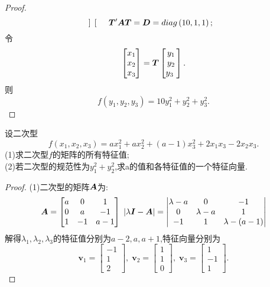 \documentclass[lang=cn,11pt,normal]{elegantbook}
\begin{document}
\begin{proof}
\begin{equation}
\begin{bmatrix}
		\end{bmatrix}
		\qquad\TT'\AA\TT=\DD=diag\left(10,1,1\right);
		\end{equation}
		令
		\begin{equation}
		\begin{bmatrix}
		x_1\\x_2\\x_3
		\end{bmatrix}
		=
		\TT
		\begin{bmatrix}
		y_1\\y_2\\y_3\
		\end{bmatrix}.
		\end{equation}
		则
		\begin{equation}
		f(y_1,y_2,y_3)=10y_1^2+y_2^2+y_3^2.
		\end{equation}
	\end{proof}
	\begin{exercise}
		设二次型
		\begin{equation}
		f(x_1,x_2,x_3)=ax_1^2+ax_2^2+(a-1)x_3^2+2x_1x_3-2x_2x_3.
		\end{equation}
		(1)求二次型$f$的矩阵的所有特征值;\\
		(2)若二次型的规范性为$y_1^2+y_2^2$,求a的值和各特征值的一个特征向量.
	\end{exercise}
	\begin{proof}
		(1)二次型的矩阵$\AA$为:
		\begin{equation}
		\AA=
		\begin{bmatrix}
		a&0&1\\
		0&a&-1\\
		1&-1&a-1
		\end{bmatrix}\;
		|\lambda\II-\AA|=
		\begin{vmatrix}
		\lambda-a&0&-1\\
		0&\lambda-a&1\\
		-1&1&\lambda-(a-1)
		\end{vmatrix}
		\end{equation}
		解得$\lambda_1,\lambda_2,\lambda_3$的特征值分别为$a-2,a,a+1$,特征向量分别为
		\begin{equation}
		\boldsymbol{v}_1=\begin{bmatrix}-1\\1\\2\end{bmatrix},\;\boldsymbol{v}_2=\begin{bmatrix}1\\1\\0\end{bmatrix},\;\boldsymbol{v}_3=\begin{bmatrix}1\\-1\\1\end{bmatrix}.
		\end{equation}
	\end{proof}
\end{document}
